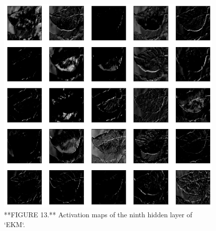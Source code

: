 \documentclass[]{article}
\begin{document}
\begin{figure}

{\centering \includegraphics[width=9.5in]{Images/FeatureMaps9} 

}

\caption{**FIGURE 13.** Activation maps of the ninth hidden layer of `EKM`.}\label{fig:maps9}
\end{figure}
\end{document}
